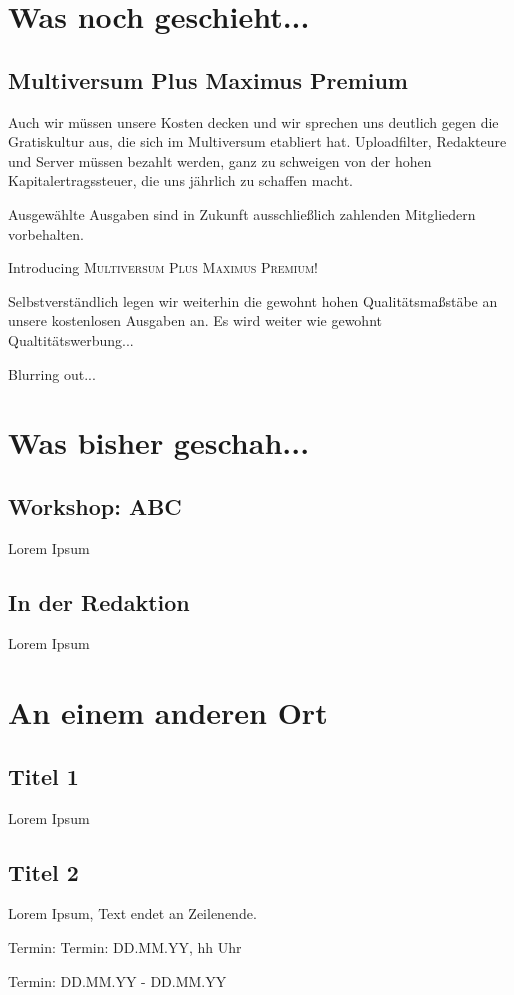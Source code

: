\documentclass[final]{multiversum}
\begin{document}
\makemultititle
%


\section{Was noch geschieht...}

\subsection{Multiversum Plus Maximus Premium}
Auch wir müssen unsere Kosten decken und wir sprechen uns deutlich gegen die Gratiskultur aus, die sich im Multiversum etabliert hat. Uploadfilter, Redakteure und Server müssen bezahlt werden, ganz zu schweigen von der hohen Kapitalertragssteuer, die uns jährlich zu schaffen macht.

Ausgewählte Ausgaben sind in Zukunft ausschließlich zahlenden Mitgliedern vorbehalten.
\begin{center}Introducing \textsc{Multiversum Plus Maximus Premium!}\end{center}

Selbstverständlich legen wir weiterhin die gewohnt hohen Qualitätsmaßstäbe an unsere kostenlosen Ausgaben an. Es wird weiter wie gewohnt Qualtitätswerbung...

Blurring out...

\section{Was bisher geschah...}

\subsection{Workshop: ABC}
Lorem Ipsum

\subsection{In der Redaktion}
Lorem Ipsum

\section{An einem anderen Ort}

\subsection{Titel 1}
Lorem Ipsum

\subsection{Titel 2}
Lorem Ipsum, Text endet an Zeilenende.


\begin{termine}
\item Termin: Termin: DD.MM.YY, hh Uhr
  \item Termin: DD.MM.YY - DD.MM.YY
\end{termine}
\impressum
\end{document}

